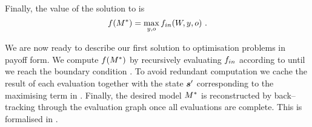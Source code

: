 Finally, the value of the solution to  is
\begin{equation}
  \label{eq:opt-entry-point}
  \Objective(\OptimalScene) = 
  \max_{y,\WallOrient} \SubProbIN(\Width,y,\WallOrient) ~.
\end{equation}

We are now ready to describe our first solution to optimisation
problems in payoff form. We compute $\Objective(\Scene^*)$ by
recursively evaluating $\SubProbIN$ according to
 until we reach the boundary condition
. To avoid redundant computation we cache the
result of each evaluation together with the state $\State'$
corresponding to the maximising term in
. Finally, the desired model $\OptimalScene$
is reconstructed by back--tracking through the evaluation graph once
all evaluations are complete. This is formalised in
.


